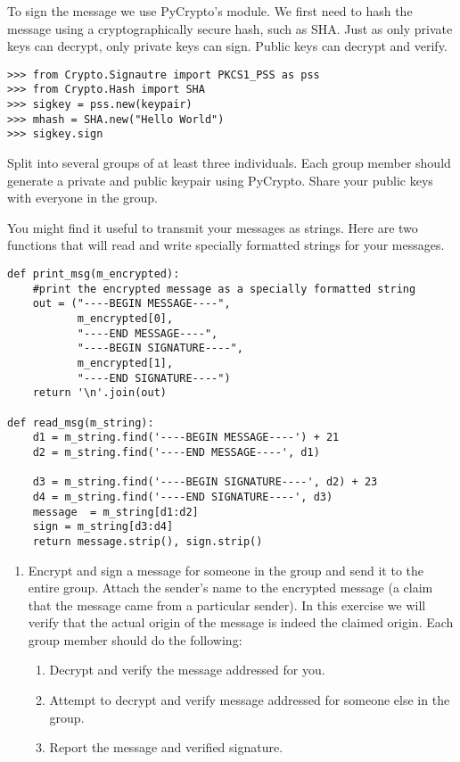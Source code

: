 To sign the message we use PyCrypto's  module.
We first need to hash the message using a cryptographically secure hash, such as SHA.
Just as only private keys can decrypt, only private keys can sign.
Public keys can decrypt and verify.
\begin{lstlisting}
>>> from Crypto.Signautre import PKCS1_PSS as pss
>>> from Crypto.Hash import SHA
>>> sigkey = pss.new(keypair)
>>> mhash = SHA.new("Hello World")
>>> sigkey.sign
\end{lstlisting}


\begin{problem}
Split into several groups of at least three individuals.
Each group member should generate a private and public keypair using PyCrypto.
Share your public keys with everyone in the group.

You might find it useful to transmit your messages as strings.
Here are two functions that will read and write specially formatted strings for your messages.
\begin{lstlisting}
def print_msg(m_encrypted):
    #print the encrypted message as a specially formatted string
    out = ("----BEGIN MESSAGE----",
           m_encrypted[0],
           "----END MESSAGE----",
           "----BEGIN SIGNATURE----",
           m_encrypted[1],
           "----END SIGNATURE----")
    return '\n'.join(out)

def read_msg(m_string):
    d1 = m_string.find('----BEGIN MESSAGE----') + 21
    d2 = m_string.find('----END MESSAGE----', d1)
    
    d3 = m_string.find('----BEGIN SIGNATURE----', d2) + 23
    d4 = m_string.find('----END SIGNATURE----', d3)
    message  = m_string[d1:d2]
    sign = m_string[d3:d4]
    return message.strip(), sign.strip()
\end{lstlisting}

\begin{enumerate}
\item Encrypt and sign a message for someone in the group and send it to the entire group.
Attach the sender's name to the encrypted message (a claim that the message came from a particular sender).
In this exercise we will verify that the actual origin of the message is indeed the claimed origin.
Each group member should do the following:
\begin{enumerate}
\item Decrypt and verify the message addressed for you.
\item Attempt to decrypt and verify message addressed for someone else in the group.
\item Report the message and verified signature.
\end{enumerate}


\end{enumerate}
\end{problem}
